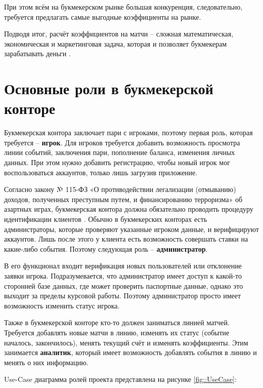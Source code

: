 При этом всём на букмекерском рынке большая конкуренция, следовательно, требуется предлагать самые выгодные коэффициенты на рынке.

Подводя итог, расчёт коэффициентов на матчи -- сложная математическая, экономическая и маркетинговая задача, которая и позволяет букмекерам зарабатывать деньги \cite{kfs}.

\section{Основные роли в букмекерской конторе}
Букмекерская контора заключает пари с игроками, поэтому первая роль, которая требуется -- \textbf{игрок}. 
Для игроков требуется добавить возможность просмотра линии событий, заключения пари, пополнение баланса, изменения личных данных.
При этом нужно добавить регистрацию, чтобы новый игрок мог воспользоваться аккаунтов, только лишь загрузив приложение. 

Согласно закону № 115-ФЗ «О противодействии легализации (отмыванию) доходов, полученных преступным путем, и финансированию терроризма» об азартных играх, букмекерская контора должна обязательно проводить процедуру идентификации клиентов \cite{bk2}. 
Обычно в букмекерских конторах есть администраторы, которые проверяют указанные игроком данные, и верифицируют аккаунтов. 
Лишь после этого у клиента есть возможность совершать ставки на какие-либо события.
Поэтому следующая роль -- \textbf{администратор}.

В его функционал входит верификация новых пользователей или отклонение заявки игрока.
Подразумевается, что администратор имеет доступ к какой-то сторонней базе данных, где может проверить паспортные данные, однако это выходит за пределы курсовой работы.
Поэтому администратор просто имеет возможность изменить статус игрока.

Также в букмекерской конторе кто-то должен заниматься линией матчей. 
Требуется добавлять новые матчи в линию, изменять их статус (событие началось, закончилось), менять текущий счёт и изменять коэффициенты.
Этим занимается \textbf{аналитик}, который имеет возможность добавлять события в линию и менять о них информацию.

Use-Case диаграмма ролей проекта представлена на рисунке \ref{fig::UseCase}:

